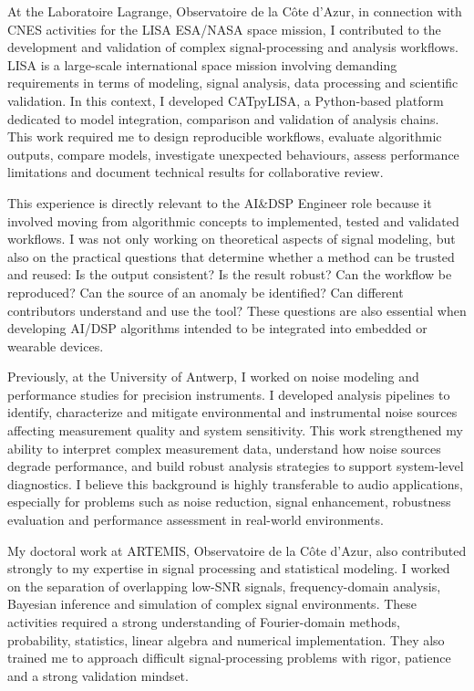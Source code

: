 \documentclass[11pt,a4paper]{../_shared/altacv}
\begin{document}
{At the Laboratoire Lagrange, Observatoire de la Côte d'Azur, in connection with CNES activities for the LISA ESA/NASA space mission, I contributed to the development and validation of complex signal-processing and analysis workflows. LISA is a large-scale international space mission involving demanding requirements in terms of modeling, signal analysis, data processing and scientific validation. In this context, I developed CATpyLISA, a Python-based platform dedicated to model integration, comparison and validation of analysis chains. This work required me to design reproducible workflows, evaluate algorithmic outputs, compare models, investigate unexpected behaviours, assess performance limitations and document technical results for collaborative review.

This experience is directly relevant to the AI\&DSP Engineer role because it involved moving from algorithmic concepts to implemented, tested and validated workflows. I was not only working on theoretical aspects of signal modeling, but also on the practical questions that determine whether a method can be trusted and reused: Is the output consistent? Is the result robust? Can the workflow be reproduced? Can the source of an anomaly be identified? Can different contributors understand and use the tool? These questions are also essential when developing AI/DSP algorithms intended to be integrated into embedded or wearable devices.

Previously, at the University of Antwerp, I worked on noise modeling and performance studies for precision instruments. I developed analysis pipelines to identify, characterize and mitigate environmental and instrumental noise sources affecting measurement quality and system sensitivity. This work strengthened my ability to interpret complex measurement data, understand how noise sources degrade performance, and build robust analysis strategies to support system-level diagnostics. I believe this background is highly transferable to audio applications, especially for problems such as noise reduction, signal enhancement, robustness evaluation and performance assessment in real-world environments.

My doctoral work at ARTEMIS, Observatoire de la Côte d'Azur, also contributed strongly to my expertise in signal processing and statistical modeling. I worked on the separation of overlapping low-SNR signals, frequency-domain analysis, Bayesian inference and simulation of complex signal environments. These activities required a strong understanding of Fourier-domain methods, probability, statistics, linear algebra and numerical implementation. They also trained me to approach difficult signal-processing problems with rigor, patience and a strong validation mindset.

}
\end{document}
